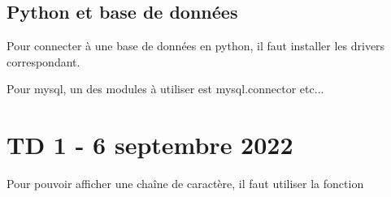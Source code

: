 \documentclass[12pt, a4paper]{article}
\begin{document}
    \subsection{Python et base de données}
    Pour connecter à une base de données en python, il faut installer 
    les drivers correspondant. 

    Pour mysql, un des modules à utiliser est mysql.connector etc... 

\newpage
\section{TD 1 - 6 septembre 2022}
Pour pouvoir afficher une chaîne de caractère, il faut utiliser la fonction
    
    


   
\end{document}

